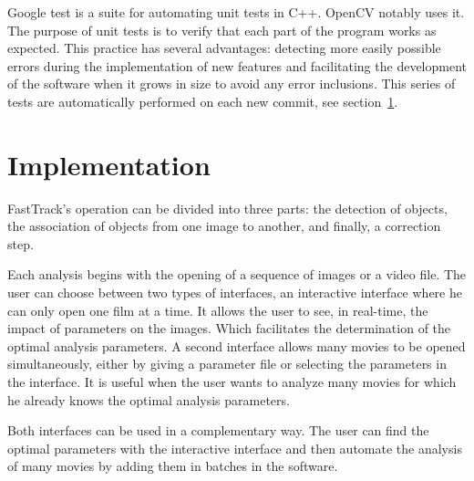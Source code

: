     Google test is a suite for automating unit tests in C++. OpenCV notably uses it. The purpose of unit tests is to verify that each part of the program works as expected. This practice has several advantages: detecting more easily possible errors during the implementation of new features and facilitating the development of the software when it grows in size to avoid any error inclusions. This series of tests are automatically performed on each new commit, see section~\ref{}.

    \section{Implementation}
    FastTrack's operation can be divided into three parts: the detection of objects, the association of objects from one image to another, and finally, a correction step.

    Each analysis begins with the opening of a sequence of images or a video file. The user can choose between two types of interfaces, an interactive interface where he can only open one film at a time. It allows the user to see, in real-time, the impact of parameters on the images. Which facilitates the determination of the optimal analysis parameters. A second interface allows many movies to be opened simultaneously, either by giving a parameter file or selecting the parameters in the interface. It is useful when the user wants to analyze many movies for which he already knows the optimal analysis parameters.

    Both interfaces can be used in a complementary way. The user can find the optimal parameters with the interactive interface and then automate the analysis of many movies by adding them in batches in the software.


